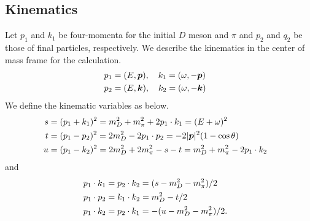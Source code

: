 \documentclass[aps,prd,preprintnumbers,showpacs,showkeys,nofootinbib,
superscriptaddress,fleqn,floatfix,tightenlines, 10pt]{revtex4-1}
\begin{document}
\subsection{Kinematics}
Let $p_1$ and $k_1$ be four-momenta for the initial $D$ meson and $\pi$ and $p_2$ and $q_2$ be those of final particles,
respectively. We describe the kinematics in the center of mass frame for the calculation.
\begin{align} \label{ddpipi_momenta}
	  & p_1 = (E, \bm{p}), \quad k_1 = (\omega, -\bm{p}) \cr
	  & p_2 = (E, \bm{k}), \quad k_2 = (\omega, -\bm{k})
\end{align}
We define the kinematic variables as below.
\begin{align}
	  s &= (p_1 + k_1)^2 = m_D^2 + m_\pi^2 + 2 p_1 \cdot k_1 = (E + \omega)^2	\cr
	  t &= (p_1 - p_2)^2 = 2 m_D^2 - 2 p_1 \cdot p_2  = -2|\bm{p}|^2 (1-\cos{\theta})	\cr
	  u &= (p_1 - k_2)^2 = 2m_D^2 + 2m_\pi^2 - s - t = m_D^2 + m_\pi^2 - 2p_1 \cdot k_2
\end{align}
and
\begin{align}
	p_1 \cdot k_1 &= p_2 \cdot k_2 = (s - m_D^2 - m_\pi^2)/2 \cr
	p_1 \cdot p_2 &= k_1 \cdot k_2 = m_D^2 - t/2 \cr
	p_1 \cdot k_2 &= p_2 \cdot k_1 = -(u - m_D^2 - m_\pi^2)/2.
\end{align}
\end{document}

